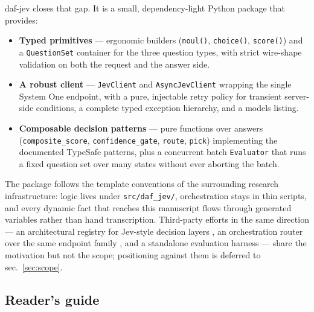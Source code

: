 \documentclass[
  english,
]{article}
\providecommand{\tightlist}{%
  \setlength{\itemsep}{0pt}\setlength{\parskip}{0pt}}
\begin{document}
daf-jev closes that gap. It is a small, dependency-light Python package
that provides:

\begin{itemize}
\tightlist
\item
  \textbf{Typed primitives} --- ergonomic builders (\texttt{noul()},
  \texttt{choice()}, \texttt{score()}) and a \texttt{QuestionSet}
  container for the three question types, with strict wire-shape
  validation on both the request and the answer side.
\item
  \textbf{A robust client} --- \texttt{JevClient} and
  \texttt{AsyncJevClient} wrapping the single System One endpoint, with
  a pure, injectable retry policy for transient server-side conditions,
  a complete typed exception hierarchy, and a models listing.
\item
  \textbf{Composable decision patterns} --- pure functions over answers
  (\texttt{composite\_score}, \texttt{confidence\_gate}, \texttt{route},
  \texttt{pick}) implementing the documented TypeSafe patterns, plus a
  concurrent batch \texttt{Evaluator} that runs a fixed question set
  over many states without ever aborting the batch.
\end{itemize}

The package follows the template conventions of the surrounding research
infrastructure: logic lives under \texttt{src/daf\_jev/}, orchestration
stays in thin scripts, and every dynamic fact that reaches this
manuscript flows through generated variables rather than hand
transcription. Third-party efforts in the same direction --- an
architectural registry for Jev-style decision layers
\citep{register2026jev}, an orchestration router over the same endpoint
family \citep{orcarouter2026jev}, and a standalone evaluation harness
\citep{elsolitario2026jev} --- share the motivation but not the scope;
positioning against them is deferred to sec.~\ref{sec:scope}.

\subsection{Reader's guide}\label{readers-guide}
\end{document}
